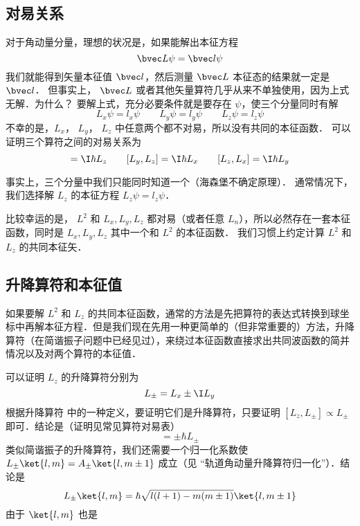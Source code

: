 \subsection{对易关系}

对于角动量分量，理想的状况是，如果能解出本征方程
\begin{equation}
\bvec L \psi  = \bvec l\psi 
\end{equation}
我们就能得到矢量本征值 $\bvec l$，然后测量 $\bvec L$ 本征态的结果就一定是 $\bvec l$． 但事实上， $\bvec L$ 或者其他矢量算符几乎从来不单独使用，因为上式无解．为什么？ 要解上式，充分必要条件就是要存在 $\psi$，使三个分量同时有解
\begin{equation}
L_x \psi  = l_x \psi \qquad
L_y \psi  = l_y \psi \qquad
L_z \psi  = l_z \psi 
\end{equation}   
不幸的是，$L_x$， $L_y$， $L_z$ 中任意两个都不对易，所以没有共同的本征函数． 可以证明三个算符之间的对易关系为
\begin{equation}
[L_x, L_y] = \I\hbar L_z \qquad
[L_y, L_z] = \I\hbar L_x \qquad
[L_z, L_x] = \I\hbar L_y
\end{equation}

事实上，三个分量中我们只能同时知道一个（海森堡不确定原理）．%
通常情况下，我们选择解 $L_z$ 的本征方程 $L_z \psi = l_z\psi$． 

比较幸运的是， $L^2$ 和 $L_x, L_y, L_z$ 都对易（或者任意 $L_n$），所以必然存在一套本征函数，同时是 $L_x, L_y, L_z$ 其中一个和 $L^2$ 的本征函数． 我们习惯上约定计算 $L^2$ 和 $L_z$ 的共同本征矢．

\subsection{升降算符和本征值}

如果要解 $L^2$ 和 $L_z$ 的共同本征函数，通常的方法是先把算符的表达式转换到球坐标中再解本征方程．但是我们现在先用一种更简单的（但非常重要的）方法，升降算符（在简谐振子问题中已经见过），来绕过本征函数直接求出共同波函数的简并情况以及对两个算符的本征值．

可以证明 $L_z$ 的升降算符分别为
\begin{equation}
L_\pm = L_x \pm \I L_y
\end{equation}
根据升降算符 中的一种定义，要证明它们是升降算符，只要证明 $[L_z, L_\pm] \propto L_\pm$ 即可．结论是（证明见常见算符对易表）%
\begin{equation}
[L_z, L_\pm] =  \pm \hbar L_ \pm
\end{equation}
类似简谐振子的升降算符，我们还需要一个归一化系数使 $L_\pm \ket{l,m} = A_ \pm \ket{l,m \pm 1}$ 成立（见 “轨道角动量升降算符归一化”）．结论是
\begin{equation}
L_\pm \ket{l, m}  = \hbar \sqrt{l(l + 1) - m(m \pm 1)} \ket{l, m \pm 1} 
\end{equation}
由于 $\ket{l,m}$ 也是

